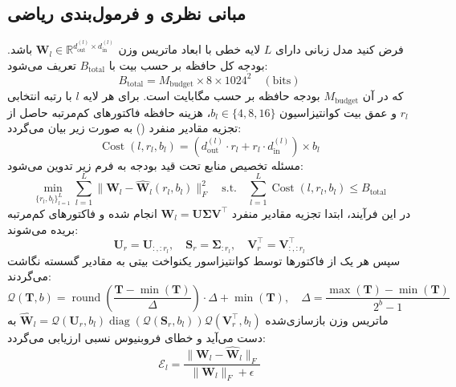 \subsection{مبانی نظری و فرمول‌بندی ریاضی}
فرض کنید مدل زبانی دارای $L$ لایه خطی با ابعاد ماتریس وزن $\mathbf{W}_l \in \mathbb{R}^{d_{\text{out}}^{(l)} \times d_{\text{in}}^{(l)}}$ باشد. بودجه کل حافظه بر حسب بیت با $B_{\text{total}}$ تعریف می‌شود:
\begin{equation}
B_{\text{total}} = M_{\text{budget}} \times 8 \times 1024^2 \quad (\text{bits})
\end{equation}
که در آن $M_{\text{budget}}$ بودجه حافظه بر حسب مگابایت است. برای هر لایه $l$ با رتبه انتخابی $r_l$ و عمق بیت کوانتیزاسیون $b_l \in \{4, 8, 16\}$، هزینه حافظه فاکتورهای کم‌مرتبه حاصل از تجزیه مقادیر منفرد () به صورت زیر بیان می‌گردد:
\begin{equation}
\operatorname{Cost}(l, r_l, b_l) = \left( d_{\text{out}}^{(l)} \cdot r_l + r_l \cdot d_{\text{in}}^{(l)} \right) \times b_l
\end{equation}
مسئله تخصیص منابع تحت قید بودجه به فرم زیر تدوین می‌شود:
\begin{equation}
\min_{\{r_l, b_l\}_{l=1}^L} \sum_{l=1}^L \|\mathbf{W}_l - \hat{\mathbf{W}}_l(r_l, b_l)\|_F^2 \quad \text{s.t.} \quad \sum_{l=1}^L \operatorname{Cost}(l, r_l, b_l) \le B_{\text{total}}
\end{equation}
در این فرآیند، ابتدا تجزیه مقادیر منفرد $\mathbf{W}_l = \mathbf{U} \mathbf{\Sigma} \mathbf{V}^\top$ انجام شده و فاکتورهای کم‌مرتبه بریده می‌شوند:
\begin{equation}
\mathbf{U}_{r} = \mathbf{U}_{:, :r_l}, \quad \mathbf{S}_{r} = \mathbf{\Sigma}_{:r_l}, \quad \mathbf{V}_{r}^\top = \mathbf{V}_{:, :r_l}^\top
\end{equation}
سپس هر یک از فاکتورها توسط کوانتیزاسور یکنواخت بیتی به مقادیر گسسته نگاشت می‌گردند:
\begin{equation}
\mathcal{Q}(\mathbf{T}, b) = \operatorname{round}\left(\frac{\mathbf{T} - \min(\mathbf{T})}{\Delta}\right) \cdot \Delta + \min(\mathbf{T}), \quad \Delta = \frac{\max(\mathbf{T}) - \min(\mathbf{T})}{2^b - 1}
\end{equation}
ماتریس وزن بازسازی‌شده $\hat{\mathbf{W}}_l = \mathcal{Q}(\mathbf{U}_r, b_l) \operatorname{diag}(\mathcal{Q}(\mathbf{S}_r, b_l)) \mathcal{Q}(\mathbf{V}_r^\top, b_l)$ به دست می‌آید و خطای فروبنیوس نسبی ارزیابی می‌گردد:
\begin{equation}
\mathcal{E}_l = \frac{\|\mathbf{W}_l - \hat{\mathbf{W}}_l\|_F}{\|\mathbf{W}_l\|_F + \epsilon}
\end{equation}

